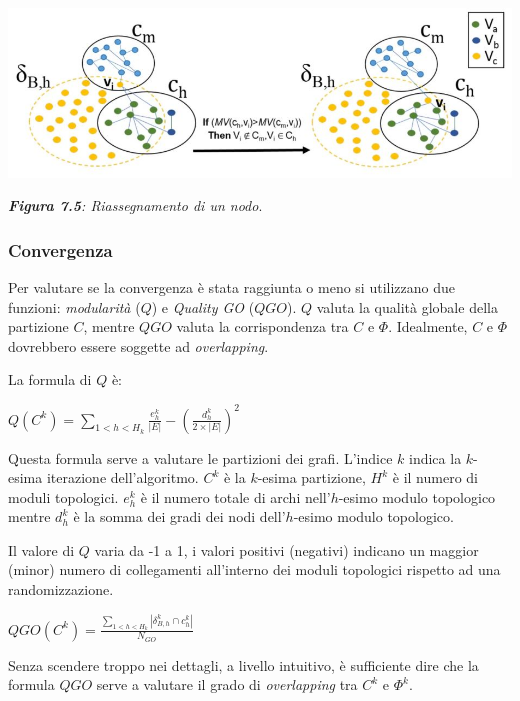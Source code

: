 \documentclass[11pt]{article}
\begin{document}
\begin{center}
\includegraphics[scale=0.64]{deltaa}

\begin{small}\textit{\textbf{Figura 7.5}: Riassegnamento di un nodo}.\end{small}
\end{center}

\subsubsection{Convergenza}
Per valutare se la convergenza è stata raggiunta o meno si utilizzano due funzioni: \textit{modularità} ($Q$) e \textit{Quality GO} ($QGO$). $Q$ valuta la qualità globale della partizione $C$, mentre $QGO$ valuta la corrispondenza tra $C$ e $\Phi$. Idealmente, $C$ e $\Phi$ dovrebbero essere soggette ad \textit{overlapping}.

La formula di $Q$ è:

\begin{center}
$Q(C^k) = \displaystyle{\sum_{1<h<H_k}\frac{e^k_h}{|E|} - \left(\frac{d^k_h}{2 \times |E|}\right)^2}$
\end{center}

Questa formula serve a valutare le partizioni dei grafi. L'indice $k$ indica la $k$-esima iterazione dell'algoritmo. $C^k$ è la $k$-esima partizione, $H^k$ è il numero di moduli topologici. $e^k_h$ è il numero totale di archi nell'$h$-esimo modulo topologico mentre $d^k_h$ è la somma dei gradi dei nodi dell'$h$-esimo modulo topologico. 

Il valore di $Q$ varia da -1 a 1, i valori positivi (negativi) indicano un maggior (minor) numero di collegamenti all'interno dei moduli topologici rispetto ad una randomizzazione. 

\begin{center}
$QGO(C^k) = \frac{\displaystyle{\sum_{1<h<H_k}|\delta^k_{B,h} \cap c^k_h|}}{N_{GO}}$
\end{center}

Senza scendere troppo nei dettagli, a livello intuitivo, è sufficiente dire che la formula $QGO$ serve a valutare il grado di \textit{overlapping} tra $C^k$ e $\Phi^k$.
\end{document}
